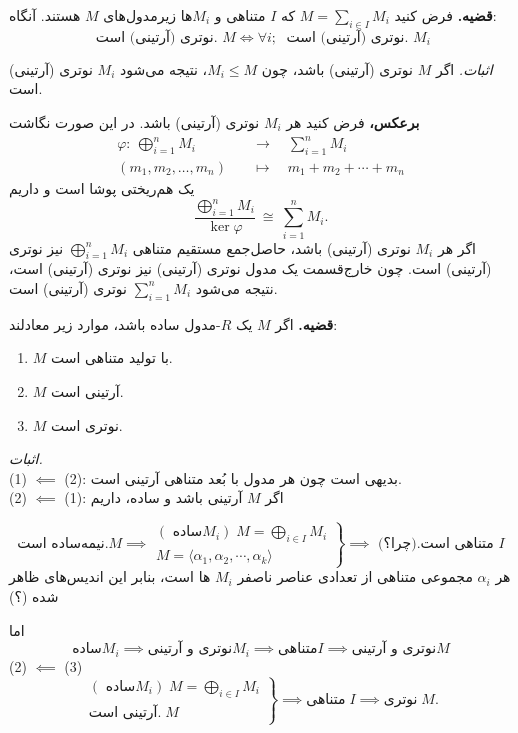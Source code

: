 \hrulefill

\textbf{قضیه.} فرض کنید $M=\sum_{i\in I} M_i$ که $I$ متناهی و $M_i$ها زیرمدول‌های $M$ هستند.
آنگاه:
\[
    \text{ نوترى (آرتینی) است. } M  \iff \forall i;\; \text{ نوترى (آرتینی) است. } M_i
\]

\textit{اثبات.}
اگر $M$ نوترى (آرتینی) باشد، چون $M_i \leqslant M$، نتیجه می‌شود $M_i$ نوترى (آرتینی) است.

\textbf{برعکس،} فرض کنید هر $M_i$ نوترى (آرتینی) باشد. در این صورت نگاشت
\[
    \begin{aligned}
        \varphi:\ \bigoplus_{i=1}^n M_i     \quad & \to      \quad \sum_{i=1}^n M_i   \\
        (m_1,m_2,\dots,m_n)                 \quad & \mapsto  \quad m_1+m_2+\cdots+m_n
    \end{aligned}
\]
یک هم‌ریختی پوشا است و داریم
\[
    \frac{\bigoplus_{i=1}^n M_i}{\ker\varphi} \ \cong\ \sum_{i=1}^n M_i.
\]
اگر هر $M_i$ نوترى (آرتینی) باشد، حاصل‌جمع مستقیم متناهی $\bigoplus_{i=1}^n M_i$ نیز نوترى (آرتینی) است.
چون خارج‌قسمت یک مدول نوترى (آرتینی) نیز نوترى (آرتینی) است، نتیجه می‌شود $\sum_{i=1}^n M_i$ نوترى (آرتینی) است.


\textbf{قضیه.} اگر $M$ یک $R$-مدول ساده باشد، موارد زیر معادلند:
\begin{enumerate}
    \item $M$ با تولید متناهی است.
    \item $M$ آرتینی است.
    \item $M$ نوترى است.
\end{enumerate}

\textit{اثبات.}\\
(1) $\impliedby$ (2): بدیهی است چون هر مدول با بُعد متناهی آرتینی است.\\
(2) $\impliedby$ (1): اگر $M$ آرتینی باشد و ساده، داریم

\[
    \text{نیمه‌ساده است.} M
    \implies
    \left.
    \begin{aligned}
        (\text{ ساده}M_i) \;M = \bigoplus_{i\in I} M_i \\
        M = \langle \alpha_1,\alpha_2, \cdots , \alpha_k \rangle
    \end{aligned}
    \right\}
    \implies
    \text{ متناهی است.(چرا؟)  } I
\]
هر
\(\alpha_i\)
مجموعی متناهی از تعدادی عناصر ناصفر
\(M_i\)
ها است، بنابر این اندیس‌های ظاهر شده (؟)

اما
\[
    \text{ساده} M_i \implies \text{نوتری و آرتینی} M_i \implies \text{متناهی} I \implies \text{نوتری و آرتینی} M
\]
(2) \(\impliedby\) (3)
\[
    \left.
    \begin{aligned}
        (\text{ ساده}M_i) \;M = \bigoplus_{i\in I} M_i \\
        \text{آرتینی است.} \;M
    \end{aligned}
    \right\}
    \implies
    \text{متناهی} \; I
    \implies
    \text{نوتری} \; M.
\]

